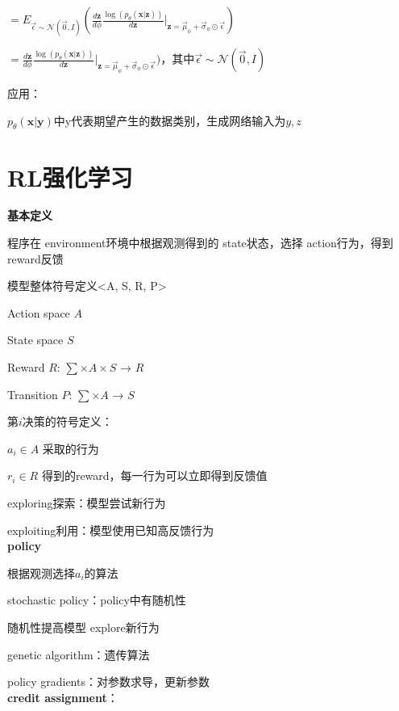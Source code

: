 \documentclass[UTF8]{ctexart}
\begin{document}
  \quad \quad \quad $ = E_{\vec{\epsilon} \sim \mathcal{N}(\vec{0}, I)}(\frac{d\mathbf{z}}{d\phi}\frac{\log(p_{\theta}(\mathbf{x} | \mathbf{z}))}{d\mathbf{z}} |_{\mathbf{z} = \vec{\mu}_{\phi} + \vec{\sigma}_{\phi} \odot \vec{\epsilon}})$

  \quad \quad \quad $ = \frac{d\mathbf{z}}{d\phi}\frac{\log(p_{\theta}(\mathbf{x} | \mathbf{z}))}{d\mathbf{z}} |_{\mathbf{z} = \vec{\mu}_{\phi} + \vec{\sigma}_{\phi} \odot \vec{\epsilon}})$，其中$\vec{\epsilon} \sim \mathcal{N}(\vec{0}, I)$
  
  应用：

  \quad $p_{\theta}(\mathbf{x} | \mathbf{y})$中y代表期望产生的数据类别，生成网络输入为$y, z$



\section{RL强化学习}
\noindent \textbf{基本定义}

  程序在 environment环境中根据观测得到的 state状态，选择 action行为，得到reward反馈

  模型整体符号定义<A, S, R, P>

  \quad Action space $A$
  
  \quad State space $S$
  
  \quad Reward $R$: $\sum \times A \times S$ → $R$
  
  \quad Transition $P$: $\sum \times A$ → $S$

  第$i$决策的符号定义：

  \quad $a_i \in A$ 采取的行为

  \quad $r_i \in R$ 得到的reward，每一行为可以立即得到反馈值
  
  exploring探索：模型尝试新行为
  
  exploiting利用：模型使用已知高反馈行为\\
\textbf{policy}

  根据观测选择$a_i$的算法

  stochastic policy：policy中有随机性

  \quad 随机性提高模型 explore新行为

  genetic algorithm：遗传算法

  policy gradients：对参数求导，更新参数\\
\textbf{credit assignment}：
\end{document}

